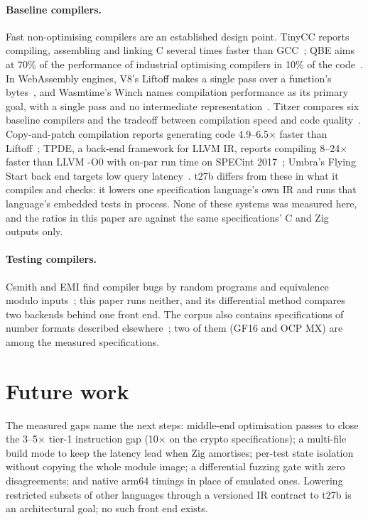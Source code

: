 \documentclass[11pt,a4paper]{article}
\begin{document}
\paragraph{Baseline compilers.}
Fast non-optimising compilers are an established design point. TinyCC
reports compiling, assembling and linking C several times faster than
GCC~\cite{tcc}; QBE aims at 70\% of the performance of industrial
optimising compilers in 10\% of the code~\cite{qbe}. In WebAssembly
engines, V8's Liftoff makes a single pass over a function's
bytes~\cite{liftoff}, and Wasmtime's Winch names compilation performance
as its primary goal, with a single pass and no intermediate
representation~\cite{winch}. Titzer compares six baseline compilers and
the tradeoff between compilation speed and code
quality~\cite{titzer2023}. Copy-and-patch compilation reports generating
code 4.9--6.5$\times$ faster than Liftoff~\cite{copypatch}; TPDE, a
back-end framework for LLVM IR, reports compiling 8--24$\times$ faster
than LLVM -O0 with on-par run time on SPECint 2017~\cite{tpde}; Umbra's
Flying Start back end targets low query latency~\cite{umbra}. t27b differs from
these in what it compiles and checks: it lowers one specification
language's own IR and runs that language's embedded tests in process. None
of these systems was measured here, and the ratios in this paper are
against the same specifications' C and Zig outputs only.

\paragraph{Testing compilers.}
Csmith and EMI find
compiler bugs by random programs and equivalence modulo
inputs~\cite{csmith,emi}; this paper runs neither, and its differential
method compares two backends behind one front end. The corpus also
contains specifications of number formats described
elsewhere~\cite{goldenfloat,goldenruler}; two of them (GF16 and OCP MX)
are among the measured specifications.

\section{Future work}

The measured gaps name the next steps: middle-end optimisation passes to
close the 3--5$\times$ tier-1 instruction gap (10$\times$ on the crypto
specifications); a multi-file build mode to keep
the latency lead when Zig amortises; per-test state isolation without
copying the whole module image; a differential fuzzing gate with zero
disagreements; and native arm64 timings in place of emulated ones.
Lowering restricted subsets of other languages through a versioned IR
contract to t27b is an architectural goal; no such front end exists.
\end{document}
